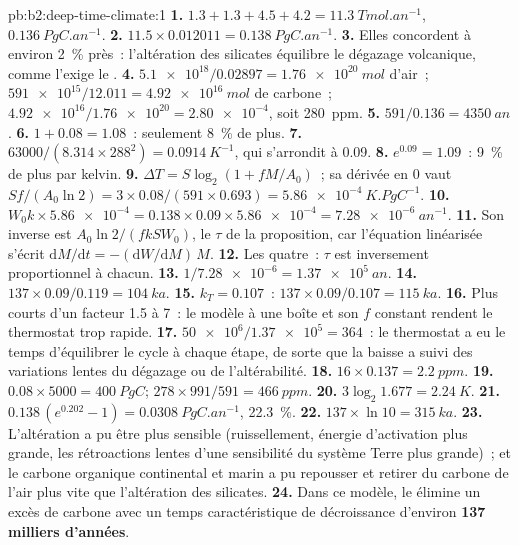 \begin{solution}{pb:b2:deep-time-climate:1}
\textbf{1.} $1.3 + 1.3 + 4.5 + 4.2 = \qty{11.3}{Tmol.an^{-1}}$, $\qty{0.136}{PgC.an^{-1}}$.
\textbf{2.} $11.5\times0.012011 = \qty{0.138}{PgC.an^{-1}}$.
\textbf{3.} Elles concordent à environ \qty{2}{\percent} près~: l'altération des silicates équilibre le dégazage
volcanique, comme l'exige le .
\textbf{4.} $\num{5.1e18}/0.02897 = \qty{1.76e20}{mol}$ d'air~; $\num{591e15}/12.011 =
\qty{4.92e16}{mol}$ de carbone~; $\num{4.92e16}/\num{1.76e20} = \num{2.80e-4}$, soit \qty{280}{ppm}.
\textbf{5.} $591/0.136 = \qty{4350}{an}$.
\textbf{6.} $1 + 0.08 = 1.08$~: seulement \qty{8}{\percent} de plus.
\textbf{7.} $63000/(8.314\times288^2) = \qty{0.0914}{K^{-1}}$, qui s'arrondit à 0.09.
\textbf{8.} $e^{0.09} = 1.09$~: \qty{9}{\percent} de plus par kelvin.
\textbf{9.} $\Delta T = S\log_2(1 + fM/A_0)$~; sa dérivée en 0 vaut $Sf/(A_0\ln2) =
3\times0.08/(591\times0.693) = \qty{5.86e-4}{K.PgC^{-1}}$.
\textbf{10.} $W_0k\times\num{5.86e-4} = 0.138\times0.09\times\num{5.86e-4} = \qty{7.28e-6}{an^{-1}}$.
\textbf{11.} Son inverse est $A_0\ln2/(fkSW_0)$, le $\tau$ de la proposition, car l'équation
linéarisée s'écrit $\mathrm dM/\mathrm dt = -(\mathrm dW/\mathrm dM)\,M$.
\textbf{12.} Les quatre~: $\tau$ est inversement proportionnel à chacun.
\textbf{13.} $1/\num{7.28e-6} = \qty{1.37e5}{an}$.
\textbf{14.} $137\times0.09/0.119 = \qty{104}{ka}$.
\textbf{15.} $k_T = 0.107$~: $137\times0.09/0.107 = \qty{115}{ka}$.
\textbf{16.} Plus courts d'un facteur 1.5 à 7~: le modèle à une boîte et son $f$ constant rendent le
thermostat trop rapide.
\textbf{17.} $\num{50e6}/\num{1.37e5} = 364$~: le thermostat a eu le temps d'équilibrer le cycle à chaque
étape, de sorte que la baisse a suivi des variations lentes du dégazage ou de l'altérabilité.
\textbf{18.} $16\times0.137 = \qty{2.2}{ppm}$.
\textbf{19.} $0.08\times5000 = \qty{400}{PgC}$; $278\times991/591 = \qty{466}{ppm}$.
\textbf{20.} $3\log_2 1.677 = \qty{2.24}{K}$.
\textbf{21.} $0.138\,(e^{0.202} - 1) = \qty{0.0308}{PgC.an^{-1}}$, \qty{22.3}{\percent}.
\textbf{22.} $137\times\ln10 = \qty{315}{ka}$.
\textbf{23.} L'altération a pu être plus sensible (ruissellement, énergie d'activation plus grande, les
rétroactions lentes d'une sensibilité du système Terre plus grande)~; et le carbone organique continental et marin a pu
repousser et retirer du carbone de l'air plus vite que l'altération des silicates.
\textbf{24.} Dans ce modèle, le  élimine un excès de carbone avec un
temps caractéristique de décroissance d'environ \textbf{\qty[text-series-to-math=true]{137}{} milliers d'années}.
\end{solution}
